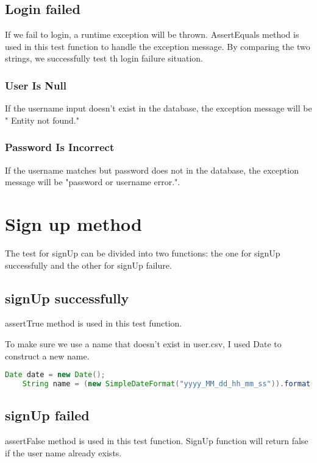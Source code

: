 \documentclass[a4paper]{report}
\begin{document}
\subsection{Login failed}
\par If we fail to login, a runtime exception will be thrown. AssertEquals method is used in this test function to handle the exception message. By comparing the two strings, we successfully test th login failure situation.
\subsubsection{User Is Null}
 \par If the username input doesn't exist in the database, the exception message will be " Entity not found." 
\subsubsection{Password Is Incorrect}
\par If the username matches but password does not in the database, the exception message will be "password or username error.". 
\section{Sign up method}
\par The test for signUp can be divided into two functions: the one for signUp successfully and the other for signUp failure.
\subsection{signUp successfully}
\par assertTrue method is used in this test function.
\par To make sure we use a name that doesn't exist in user.csv, I used Date to construct a new name.
\begin{lstlisting}[language=java]
    Date date = new Date();
    String name = (new SimpleDateFormat("yyyy_MM_dd_hh_mm_ss")).format(date);
\end{lstlisting}

\subsection{signUp failed}
\par assertFalse method is used in this test function. SignUp function will return false if the user name already exists.
\end{document}
